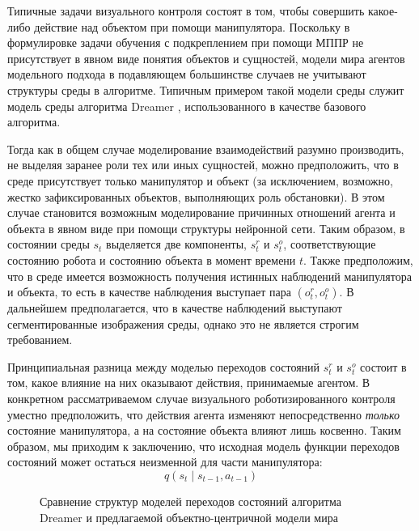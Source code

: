 Типичные задачи визуального контроля состоят в том, чтобы совершить какое-либо действие над объектом при помощи манипулятора.
Поскольку в формулировке задачи обучения с подкреплением при помощи МППР не присутствует в явном виде понятия объектов и сущностей, модели мира агентов модельного подхода в подавляющем большинстве случаев не учитывают структуры среды в алгоритме.
Типичным примером такой модели среды служит модель среды алгоритма Dreamer \cite{dreamer}, использованного в качестве базового алгоритма.

Тогда как в общем случае моделирование взаимодействий разумно производить, не выделяя заранее роли тех или иных сущностей, можно предположить, что в среде присутствует только манипулятор и объект (за исключением, возможно, жестко зафиксированных объектов, выполняющих роль обстановки).
В этом случае становится возможным моделирование причинных отношений агента и объекта в явном виде при помощи структуры нейронной сети.
Таким образом, в состоянии среды $s_t$ выделяется две компоненты, $s^r_t$ и $s^o_t$, соответствующие состоянию робота и состоянию объекта в момент времени $t$.
Также предположим, что в среде имеется возможность получения истинных наблюдений манипулятора и объекта, то есть в качестве наблюдения выступает пара $\left(o^r_t, o^o_t\right)$.
В дальнейшем предполагается, что в качестве наблюдений выступают сегментированные изображения среды, однако это не является строгим требованием.

Принципиальная разница между моделью переходов состояний $s^r_t$ и $s^o_t$ состоит в том, какое влияние на них оказывают действия, принимаемые агентом.
В конкретном рассматриваемом случае визуального роботизированного контроля уместно предположить, что действия агента изменяют непосредственно \textit{только} состояние манипулятора, а на состояние объекта влияют лишь косвенно.
Таким образом, мы приходим к заключению, что исходная модель функции переходов состояний может остаться неизменной для части манипулятора:
\begin{equation}
    q\left(s_{t} \mid s_{t-1}, a_{t-1}\right) 
\end{equation}

\begin{figure}[t]%
    \centering
    \scalebox{0.7}{
        
    }
    \quad
    \scalebox{0.7}{
        
    }
    \caption{Сравнение структур моделей переходов состояний алгоритма Dreamer \cite{dreamer} и предлагаемой объектно-центричной модели мира}
    \label{fig:wm_comparison}
\end{figure}

